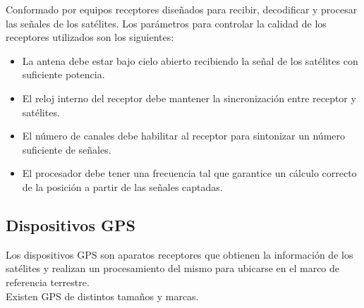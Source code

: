 Conformado por equipos receptores diseñados para recibir, decodificar y procesar las señales de los satélites. Los parámetros para controlar la calidad de los receptores utilizados son los siguientes:

\begin{itemize}
	\item La antena debe estar bajo cielo abierto recibiendo la señal de los satélites con suficiente potencia.
	\item El reloj interno del receptor debe mantener la sincronización entre receptor y satélites.
	\item El número de canales debe habilitar al receptor para sintonizar un número suficiente de señales.
	\item El procesador debe tener una frecuencia tal que garantice un cálculo correcto de la posición a partir de las señales captadas.	
\end{itemize}

\cite{termal2014prototipo}

\subsection{Dispositivos GPS}
Los dispositivos GPS son aparatos receptores que obtienen la información de los satélites y realizan un procesamiento del mismo para ubicarse en el marco de referencia terrestre. \\

Existen GPS de distintos tamaños y marcas.

